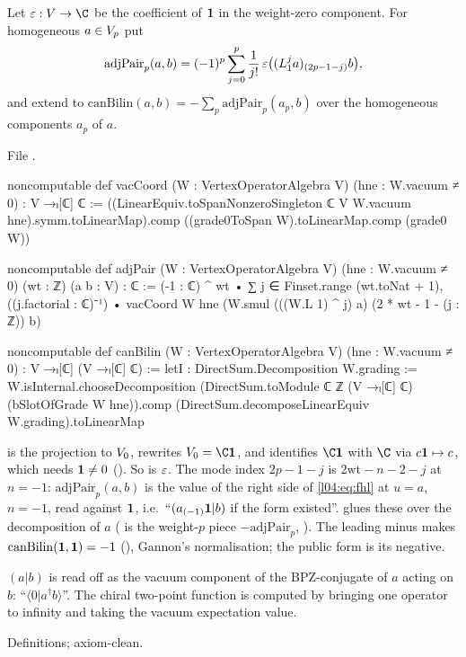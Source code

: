 \begin{definition}\label{l04:def:canbilin}
Let $\lfourvc:\lfourV\to\C$ be the coefficient of $\mathbf{1}$ in the weight-zero component. For homogeneous
$a\in V_p$ put
\begin{equation*}
\mathrm{adjPair}_p(a,b) = (-1)^p\sum_{j=0}^{p}\frac1{j!}\,\varepsilon\big((L_1^ja)_{(2p-1-j)}b\big),
\end{equation*}
and extend to $\mathrm{canBilin}(a,b) = -\sum_p\mathrm{adjPair}_p(a_p,b)$ over the homogeneous components
$a_p$ of $a$.
\end{definition}
\noindent File .
\begin{leancode}
noncomputable def vacCoord (W : VertexOperatorAlgebra V) (hne : W.vacuum ≠ 0) : V →ₗ[ℂ] ℂ :=
  ((LinearEquiv.toSpanNonzeroSingleton ℂ V W.vacuum hne).symm.toLinearMap).comp
    ((grade0ToSpan W).toLinearMap.comp (grade0 W))

noncomputable def adjPair (W : VertexOperatorAlgebra V) (hne : W.vacuum ≠ 0) (wt : ℤ)
    (a b : V) : ℂ :=
  (-1 : ℂ) ^ wt • ∑ j ∈ Finset.range (wt.toNat + 1), ((j.factorial : ℂ)⁻¹) •
    vacCoord W hne (W.smul (((W.L 1) ^ j) a) (2 * wt - 1 - (j : ℤ)) b)

noncomputable def canBilin (W : VertexOperatorAlgebra V) (hne : W.vacuum ≠ 0) :
    V →ₗ[ℂ] (V →ₗ[ℂ] ℂ) :=
  letI : DirectSum.Decomposition W.grading := W.isInternal.chooseDecomposition
  (DirectSum.toModule ℂ ℤ (V →ₗ[ℂ] ℂ) (bSlotOfGrade W hne)).comp
    (DirectSum.decomposeLinearEquiv W.grading).toLinearMap
\end{leancode}
\begin{dictionary}
 is the projection to $V_0$,  rewrites $\lfourV_0 = \C\lfourvac$, and
 identifies $\C\lfourvac$ with $\C$ via $c\mathbf{1}\mapsto c$, which needs
$\mathbf{1}\ne0$ (). So  is $\varepsilon$. The mode index $2p-1-j$ is
$2\mathrm{wt}-n-2-j$ at $n = -1$: $\mathrm{adjPair}_p(a,b)$ is the value of the right side of
\eqref{l04:eq:fhl} at $u = a$, $n = -1$, read against $\mathbf{1}$, i.e.\ ``$(a_{(-1)}\mathbf{1}|b)$ if the form
existed''.  glues these over the decomposition of $a$ ( is the
weight-$p$ piece $-\mathrm{adjPair}_p$, ). The leading minus makes
$\mathrm{canBilin}(\mathbf{1},\mathbf{1}) = -1$ (), Gannon's normalisation; the public
form is its negative.
\end{dictionary}
\begin{physics}
$(a|b)$ is read off as the vacuum component of the BPZ-conjugate of $a$ acting on $b$: ``$\langle0|
a^\dagger b\rangle$''. The chiral two-point function is computed by bringing one operator to infinity and
taking the vacuum expectation value.
\end{physics}
\begin{status}
Definitions; axiom-clean.
\end{status}

